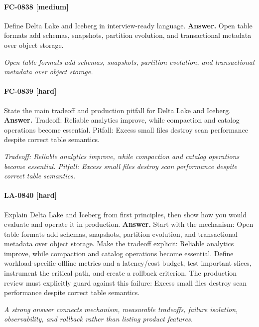 \paragraph{FC-0838 [medium]} Define Delta Lake and Iceberg in interview-ready language.
\noindent\textbf{Answer.} Open table formats add schemas, snapshots, partition evolution, and transactional metadata over object storage.
\par\textit{Open table formats add schemas, snapshots, partition evolution, and transactional metadata over object storage.}
\paragraph{FC-0839 [hard]} State the main tradeoff and production pitfall for Delta Lake and Iceberg.
\noindent\textbf{Answer.} Tradeoff: Reliable analytics improve, while compaction and catalog operations become essential. Pitfall: Excess small files destroy scan performance despite correct table semantics.
\par\textit{Tradeoff: Reliable analytics improve, while compaction and catalog operations become essential. Pitfall: Excess small files destroy scan performance despite correct table semantics.}
\paragraph{LA-0840 [hard]} Explain Delta Lake and Iceberg from first principles, then show how you would evaluate and operate it in production.
\noindent\textbf{Answer.} Start with the mechanism: Open table formats add schemas, snapshots, partition evolution, and transactional metadata over object storage. Make the tradeoff explicit: Reliable analytics improve, while compaction and catalog operations become essential. Define workload-specific offline metrics and a latency/cost budget, test important slices, instrument the critical path, and create a rollback criterion. The production review must explicitly guard against this failure: Excess small files destroy scan performance despite correct table semantics.
\par\textit{A strong answer connects mechanism, measurable tradeoffs, failure isolation, observability, and rollback rather than listing product features.}
